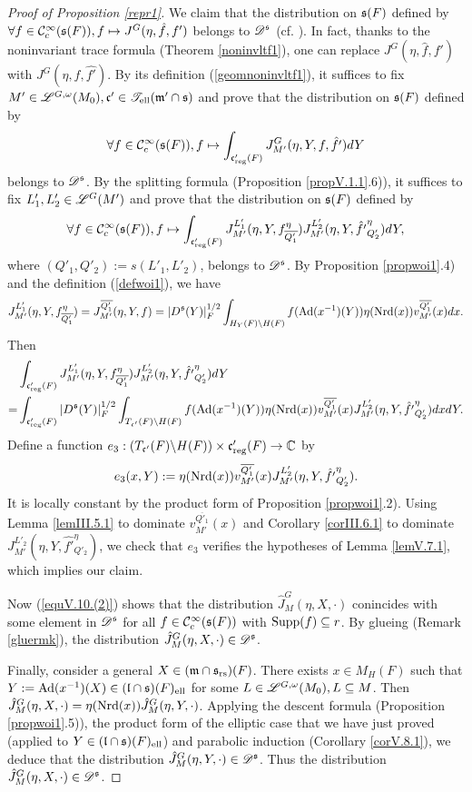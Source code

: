 \documentclass[a4paper]{amsart}
\newcommand{\fm}{{\mathfrak{m}}} \newcommand{\fn}{{\mathfrak{n}}}\newcommand{\fo}{{\mathfrak{o}}} \newcommand{\fp}{{\mathfrak{p}}}
\newcommand{\ov}{\overline}
\theoremstyle{definition}
\theoremstyle{remark}
\numberwithin{equation}{subsection}
\begin{document}
\begin{proof}[Proof of Proposition \ref{repr1}]
We claim that the distribution on ${\mathfrak{s}}(F)$ defined by $\forall f\in{\mathcal {C}}_c^\infty({\mathfrak{s}}(F)), f\mapsto J^G(\eta,\hat{f},f')$ belongs to $\mathscr{D}^{\mathfrak{s}}$ (cf. \cite[(3) in \S V.10]{MR1344131}). In fact, thanks to the noninvariant trace formula (Theorem \ref{noninvltf1}), one can replace $J^G(\eta,\hat{f},f')$ with $J^G(\eta,f,\hat{f'})$. By its definition (\ref{geomnoninvltf1}), it suffices to fix $M'\in\msl^{G,\omega}(M_0), \fc'\in\mst_\el(\fm'\cap\fs)$ and prove that the distribution on ${\mathfrak{s}}(F)$ defined by
$$ \forall f\in{\mathcal {C}}_c^\infty({\mathfrak{s}}(F)), f\mapsto \int_{{\mathfrak{c}}'_{\mathrm{reg}}(F)} J_{M'}^G(\eta,Y,f,\hat{f'})dY $$
belongs to $\mathscr{D}^{\mathfrak{s}}$. By the splitting formula (Proposition \ref{propV.1.1}.6)), it suffices to fix $L'_1,L'_2\in\mathscr{L}^G(M')$ and prove that the distribution on ${\mathfrak{s}}(F)$ defined by
$$ \forall f\in\CC_c^\infty(\fs(F)), f\mapsto \int_{\fc'_\reg(F)} J_{M'}^{L'_1}(\eta,Y,f_{\ov{Q'_1}}^\eta) J_{M'}^{L'_2}(\eta,Y,\hat{f'}_{Q'_2}^\eta)dY, $$
where $(Q'_1,Q'_2):=s(L'_1,L'_2)$, belongs to $\mathscr{D}^{\mathfrak{s}}$. By Proposition \ref{propwoi1}.4) and the definition (\ref{defwoi1}), we have
$$ J_{M'}^{L'_1}(\eta,Y,f_{\ov{Q'_1}}^\eta)=J_{M'}^{\ov{Q'_1}}(\eta,Y,f)=|D^\fs(Y)|_F^{1/2} \int_{H_Y(F)\bs H(F)} f(\Ad(x^{-1})(Y)) \eta(\Nrd(x)) v_{M'}^{\ov{Q'_1}}(x) dx. $$
Then
\[\begin{split}
 &\int_{\fc'_\reg(F)} J_{M'}^{L'_1}(\eta,Y,f_{\ov{Q'_1}}^\eta) J_{M'}^{L'_2}(\eta,Y,\hat{f'}_{Q'_2}^\eta)dY \\
=&\int_{\fc'_\reg(F)} |D^\fs(Y)|_F^{1/2} \int_{T_{\fc'}(F)\bs H(F)} f(\Ad(x^{-1})(Y)) \eta(\Nrd(x)) v_{M'}^{\ov{Q'_1}}(x) J_{M'}^{L'_2}(\eta,Y,\hat{f'}_{Q'_2}^\eta) dxdY. 
\end{split}\]
Define a function $e_3: (T_{{\mathfrak{c}}'}(F)\backslash H(F))\times{\mathfrak{c}}'_{\mathrm{reg}}(F)\rightarrow{\mathbb {C}}$ by
$$ e_3(x,Y):=\eta(\Nrd(x)) v_{M'}^{\ov{Q'_1}}(x) J_{M'}^{L'_2}(\eta,Y,\hat{f'}_{Q'_2}^\eta). $$
It is locally constant by the product form of Proposition \ref{propwoi1}.2). Using Lemma \ref{lemIII.5.1} to dominate $ v_{M'}^{\ov{Q'_1}}(x)$ and Corollary \ref{corIII.6.1} to dominate $J_{M'}^{L'_2}(\eta,Y,\hat{f'}_{Q'_2}^\eta)$, we check that $e_3$ verifies the hypotheses of Lemma \ref{lemV.7.1}, which implies our claim. 

Now (\ref{equV.10.(2)}) shows that the distribution $\hat{J}_M^G(\eta, X, \cdot)$ conincides with some element in $\mathscr{D}^{\mathfrak{s}}$ for all $f\in{\mathcal {C}}_c^\infty({\mathfrak{s}}(F))$ with ${\mathrm{Supp}}(f)\subseteq r$. By glueing (Remark \ref{gluermk}), the distribution $\hat{J}_M^G(\eta, X, \cdot)\in\mathscr{D}^{\mathfrak{s}}$. 

Finally, consider a general $X\in(\fm\cap\fs_\rs)(F)$. There exists $x\in M_H(F)$ such that $Y:={\mathrm{Ad}}(x^{-1})(X)\in({\mathfrak{l}}\cap{\mathfrak{s}})(F)_{\mathrm{ell}}$ for some $L\in\mathscr{L}^{G,\omega}(M_0), L\subseteq M$. Then $\hat{J}_M^G(\eta, X, \cdot)=\eta({\mathrm{Nrd}}(x))\hat{J}_M^G(\eta, Y, \cdot)$. Applying the descent formula (Proposition \ref{propwoi1}.5)), the product form of the elliptic case that we have just proved (applied to $Y\in({\mathfrak{l}}\cap{\mathfrak{s}})(F)_{\mathrm{ell}}$) and parabolic induction (Corollary \ref{corV.8.1}), we deduce that the distribution $\hat{J}_M^G(\eta, Y, \cdot)\in\mathscr{D}^{\mathfrak{s}}$. Thus the distribution $\hat{J}_M^G(\eta, X, \cdot)\in\mathscr{D}^{\mathfrak{s}}$. 
\end{proof}
\end{document}
